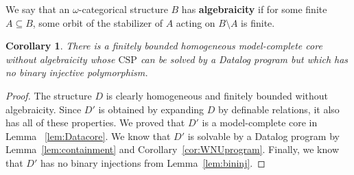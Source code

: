 \documentclass{article}
\newtheorem{corollary}[theorem]{Corollary}
\theoremstyle{remark}
\theoremstyle{definition}
\begin{document}
We say that an $\omega$-categorical structure $B$ has \textbf{algebraicity} if for some finite $A\subseteq B$, some orbit of the stabilizer of $A$ %
acting on $B\setminus A$ is finite. 

\begin{corollary}\label{cor:conclusionq3} There is a finitely bounded homogeneous model-complete core without algebraicity whose $\mathrm{CSP}$ can be solved by a Datalog program but which has no binary injective polymorphism.
\end{corollary}
\begin{proof} The structure $D$ is clearly homogeneous and finitely bounded without algebraicity. Since $D'$ is obtained by expanding $D$ by definable relations, it also has all of these properties. We proved that $D'$ is a model-complete core in Lemma ~\ref{lem:Datacore}. We know that $D'$ is solvable by a Datalog program by Lemma~\ref{lem:containment} and Corollary~\ref{cor:WNUprogram}. Finally, we know that $D'$ has no binary injections from Lemma~\ref{lem:bininj}.
\end{proof}





 \printbibliography
\end{document}

